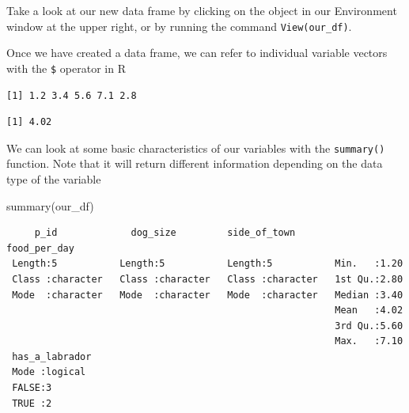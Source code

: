 \documentclass[
  letterpaper,
  DIV=11,
  numbers=noendperiod]{scrreprt}
\newenvironment{Shaded}{\begin{snugshade}}{\end{snugshade}}
\newcommand{\FunctionTok}[1]{\textcolor[rgb]{0.28,0.35,0.67}{#1}}
\newcommand{\NormalTok}[1]{\textcolor[rgb]{0.00,0.23,0.31}{#1}}
\newcommand{\SpecialCharTok}[1]{\textcolor[rgb]{0.37,0.37,0.37}{#1}}
\begin{document}
Take a look at our new data frame by clicking on the object in our
Environment window at the upper right, or by running the command
\texttt{View(our\_df)}.

Once we have created a data frame, we can refer to individual variable
vectors with the \texttt{\$} operator in R

\begin{Shaded}
\end{Shaded}

\begin{verbatim}
[1] 1.2 3.4 5.6 7.1 2.8
\end{verbatim}

\begin{Shaded}
\end{Shaded}

\begin{verbatim}
[1] 4.02
\end{verbatim}

We can look at some basic characteristics of our variables with the
\texttt{summary()} function. Note that it will return different
information depending on the data type of the variable

\begin{Shaded}
\begin{Highlighting}[]
\FunctionTok{summary}\NormalTok{(our\_df)}
\end{Highlighting}
\end{Shaded}

\begin{verbatim}
     p_id             dog_size         side_of_town        food_per_day 
 Length:5           Length:5           Length:5           Min.   :1.20  
 Class :character   Class :character   Class :character   1st Qu.:2.80  
 Mode  :character   Mode  :character   Mode  :character   Median :3.40  
                                                          Mean   :4.02  
                                                          3rd Qu.:5.60  
                                                          Max.   :7.10  
 has_a_labrador 
 Mode :logical  
 FALSE:3        
 TRUE :2        
                
                
                
\end{verbatim}
\end{document}
